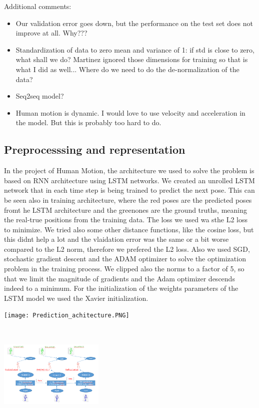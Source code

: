 Additional comments: 
\begin{itemize}
	\item Our validation error goes down, but the performance on the test set does not improve at all. Why???
	\item Standardization of data to zero mean and variance of 1: if std is close to zero, what shall we do? Martinez ignored those dimensions for training so that is what I did as well... Where do we need to do the de-normalization of the data?
	\item Seq2seq model?
	\item Human motion is dynamic. I would love to use velocity and acceleration in the model. But this is probably too hard to do.
\end{itemize}


\subsection{Preprocesssing and representation}

In the project of Human Motion, the architecture we used to solve the problem 
is based on RNN architecture using LSTM networks. We created an unrolled LSTM network that in each time step is being trained 
to predict the next pose. This can be seen also in training architecture, where the red poses are the predicted poses fromt he LSTM architecture
and the greenones are the ground truths, meaning the real-true positions from the training data.
The loss we used wa sthe L2 loss to minimize. We tried also some other distance functions, like the cosine loss, but this didnt help a lot and the 
vlaidation error was the same or a bit worse compared to the L2 norm, therefore we prefered the L2 loss.
Also we used SGD, stochastic gradient descent and the ADAM optimizer to solve the optimization problem in the training process. We clipped also the 
norms to a factor of 5, so that we limit the magnitude of gradients and the Adam optimizer descends indeed to a minimum. For the initialization  of the weights parameters of the LSTM model we used the Xavier initialization.

\texttt{[image: Prediction\_achitecture.PNG]}

\includegraphics[width=5cm,height=5cm]{Training_architecture.PNG}
